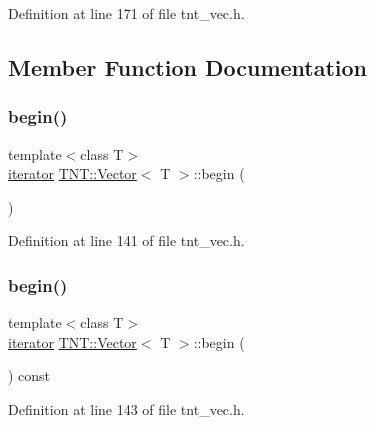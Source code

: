 Definition at line 171 of file tnt\+\_\+vec.\+h.



\subsection{Member Function Documentation}
\mbox{\label{classTNT_1_1Vector_a8be20c12f428f0762ff546d7146141a1}} 
\subsubsection{\texorpdfstring{begin()}{begin()}\hspace{0.1cm}{\footnotesize\ttfamily [1/2]}}
{\footnotesize\ttfamily template$<$class T$>$ \\
\hyperlink{classTNT_1_1Vector_a7289b2334c4c28181bb4193fa32fc48a}{iterator} \hyperlink{classTNT_1_1Vector}{T\+N\+T\+::\+Vector}$<$ T $>$\+::begin (\begin{DoxyParamCaption}{ }\end{DoxyParamCaption})\hspace{0.3cm}{\ttfamily [inline]}}



Definition at line 141 of file tnt\+\_\+vec.\+h.

\mbox{\label{classTNT_1_1Vector_a2a3e40f24376f1578eeb67a39813e580}} 
\subsubsection{\texorpdfstring{begin()}{begin()}\hspace{0.1cm}{\footnotesize\ttfamily [2/2]}}
{\footnotesize\ttfamily template$<$class T$>$ \\
\hyperlink{classTNT_1_1Vector_a7289b2334c4c28181bb4193fa32fc48a}{iterator} \hyperlink{classTNT_1_1Vector}{T\+N\+T\+::\+Vector}$<$ T $>$\+::begin (\begin{DoxyParamCaption}{ }\end{DoxyParamCaption}) const\hspace{0.3cm}{\ttfamily [inline]}}



Definition at line 143 of file tnt\+\_\+vec.\+h.


